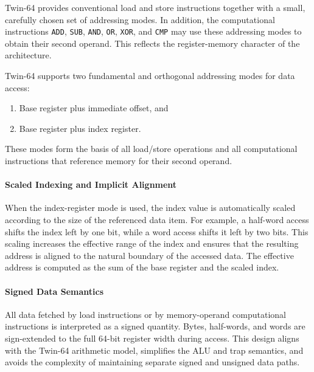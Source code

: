 
Twin-64 provides conventional load and store instructions together with a small, carefully chosen set of addressing modes. In addition, the computational instructions \texttt{ADD}, \texttt{SUB}, \texttt{AND}, \texttt{OR}, \texttt{XOR}, and \texttt{CMP} may use these addressing modes to obtain their second operand. This reflects the register-memory character of the architecture.

Twin-64 supports two fundamental and orthogonal addressing modes for data access:
\begin{enumerate}
\setlength{\itemsep}{0.5em}
\setlength{\parskip}{0pt}
    \item Base register plus immediate offset, and
    \item Base register plus index register.
\end{enumerate}
These modes form the basis of all load/store operations and all computational instructions that reference memory for their second operand.

\paragraph{Scaled Indexing and Implicit Alignment}

When the index-register mode is used, the index value is automatically scaled according to the size of the referenced data item. For example, a half-word access shifts the index left by one bit, while a word access shifts it left by two bits. This scaling increases the effective range of the index and ensures that the resulting address is aligned to the natural boundary of the accessed data. The effective address is computed as the sum of the base register and the scaled index.

\paragraph{Signed Data Semantics}

All data fetched by load instructions or by memory-operand computational instructions is interpreted as a signed quantity. Bytes, half-words, and words are sign-extended to the full 64-bit register width during access. This design aligns with the Twin-64 arithmetic model, simplifies the ALU and trap semantics, and avoids the complexity of maintaining separate signed and unsigned data paths.

